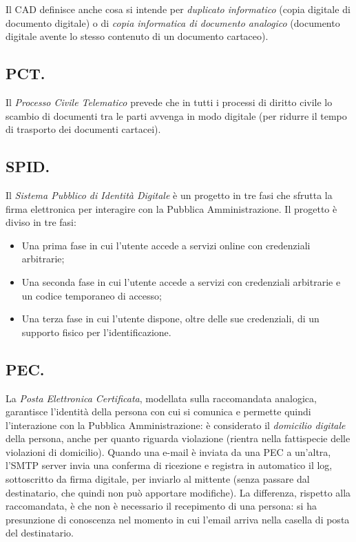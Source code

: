 \documentclass[a4page, 11pt, twocolumn]{article}
\begin{document}
Il CAD definisce anche cosa si intende per \textit{duplicato informatico} (copia digitale di documento digitale) o di \textit{copia informatica di documento analogico} (documento digitale avente lo stesso contenuto di un documento cartaceo).

\subsection{PCT.}
Il \textit{Processo Civile Telematico} prevede che in tutti i processi di diritto civile lo scambio di documenti tra le parti avvenga in modo digitale (per ridurre il tempo di trasporto dei documenti cartacei). \newline

\subsection{SPID.}
Il \textit{Sistema Pubblico di Identità Digitale} è un progetto in tre fasi che sfrutta la firma elettronica per interagire con la Pubblica Amministrazione. Il progetto è diviso in tre fasi:
\begin{itemize}
\item Una prima fase in cui l'utente accede a servizi online con credenziali arbitrarie;
\item Una seconda fase in cui l'utente accede a servizi con credenziali arbitrarie e un codice temporaneo di accesso;
\item Una terza fase in cui l'utente dispone, oltre delle sue credenziali, di un supporto fisico per l'identificazione.
\end{itemize}

\subsection{PEC.}
La \textit{Posta Elettronica Certificata}, modellata sulla raccomandata analogica, garantisce l'identità della persona con cui si comunica e permette quindi l'interazione con la Pubblica Amministrazione: è considerato il \textit{domicilio digitale} della persona, anche per quanto riguarda violazione (rientra nella fattispecie delle violazioni di domicilio).
Quando una e-mail è inviata da una PEC a un'altra, l'SMTP server invia una conferma di ricezione e registra in automatico il log, sottoscritto da firma digitale, per inviarlo al mittente (senza passare dal destinatario, che quindi non può apportare modifiche).
La differenza, rispetto alla raccomandata, è che non è necessario il recepimento di una persona: si ha presunzione di conoscenza nel momento in cui l'email arriva nella casella di posta del destinatario.
\end{document}
